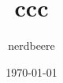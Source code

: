 \documentclass[a5paper]{article}
\begin{document}
\title{ccc}
\author{nerdbeere}
\date{\today}

\maketitle
\end{document}
